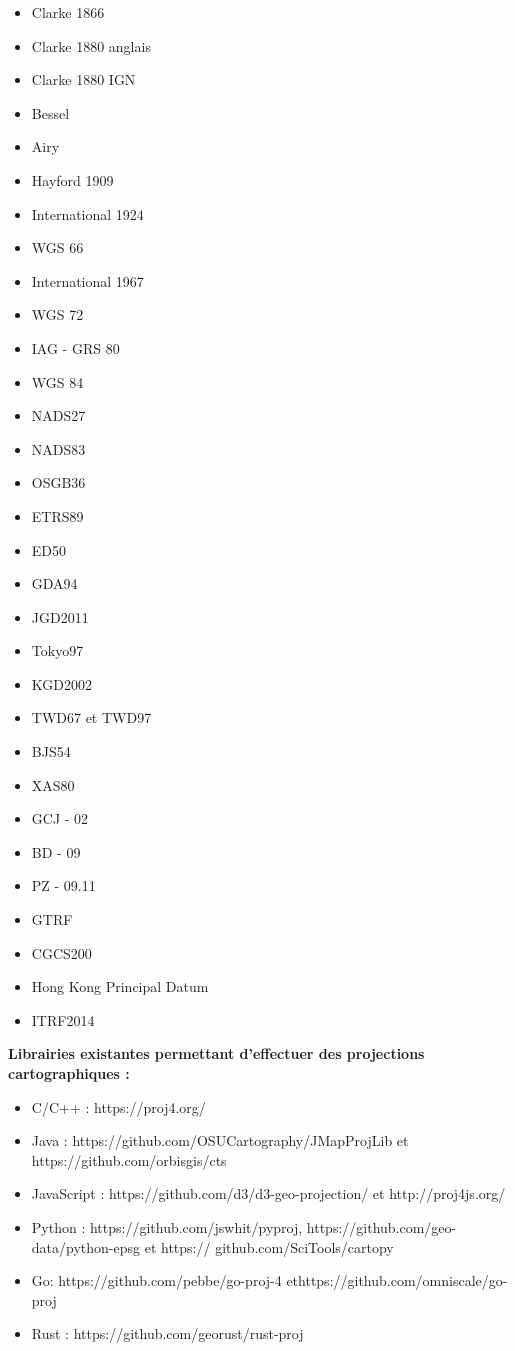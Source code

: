 \documentclass{article}
\begin{document}
\begin{itemize}
    \item Clarke 1866
    \item Clarke 1880 anglais
    \item Clarke 1880 IGN
    \item Bessel
    \item Airy
    \item Hayford 1909
    \item International 1924
    \item WGS 66
    \item International 1967
    \item WGS 72
    \item IAG - GRS 80
    \item WGS 84
    \item NADS27
    \item NADS83
    \item OSGB36
    \item ETRS89
    \item ED50
    \item GDA94
    \item JGD2011
    \item Tokyo97
    \item KGD2002
    \item TWD67 et TWD97
    \item BJS54
    \item XAS80
    \item GCJ - 02
    \item BD - 09
    \item PZ - 09.11
    \item GTRF
    \item CGCS200
    \item Hong Kong Principal Datum
    \item ITRF2014
\end{itemize}



\textbf{Librairies existantes permettant d'effectuer des projections cartographiques :}

\begin{itemize} 
	\item C/C++ : https://proj4.org/
	\item Java : https://github.com/OSUCartography/JMapProjLib et https://github.com/orbisgis/cts
	\item JavaScript : https://github.com/d3/d3-geo-projection/ et http://proj4js.org/
	\item Python : https://github.com/jswhit/pyproj, https://github.com/geo-data/python-epsg et https://			github.com/SciTools/cartopy
	\item Go: https://github.com/pebbe/go-proj-4 ethttps://github.com/omniscale/go-proj
	\item Rust : https://github.com/georust/rust-proj
\end{itemize}
\end{document}
